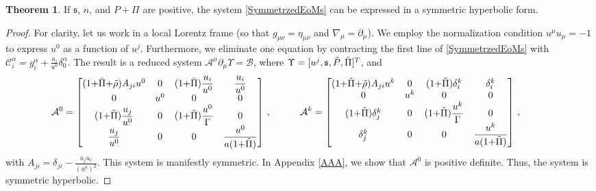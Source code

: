 \documentclass[a4paper, amsfonts, amssymb, amsmath, reprint, showkeys, nofootinbib, twoside,notitlepage,onecolumn]{revtex4-2}
\newcommand{\spc}{\quad \quad \quad}
\newcommand{\s}{{\mathfrak{s}}}
\theoremstyle{definition}
\theoremstyle{theorem}
\newtheorem{theorem}{Theorem}
\theoremstyle{corollary}
\begin{document}


\begin{theorem}
If $\s$, $n$, and $P{+}\Pi$ are positive, the system \eqref{SymmetrzedEoMs} can be expressed in a symmetric hyperbolic form.
\end{theorem}
\begin{proof}
For clarity, let us work in a local Lorentz frame (so that $g_{\mu \nu}=\eta_{\mu \nu}$ and $\nabla_\mu=\partial_\mu$). We employ the normalization condition $u^\mu u_\mu=-1$ to express $u^0$ as a function of $u^j$. Furthermore, we eliminate one equation by contracting the first line of \eqref{SymmetrzedEoMs} with $\mathcal{C}^\alpha_i=g^\alpha_i+\frac{u_i}{u^0}\delta^\alpha_0$. The result is a reduced system $\mathcal{A}^\mu \partial_\mu \Upsilon=\mathcal{B}$, where $\Upsilon=[u^j,\s,\Tilde{P},\Tilde{\Pi}]^T$, and
\begin{equation}
\mathcal{A}^0=
\begin{bmatrix}
(1 {+}\Tilde{\Pi}{+}\Tilde{\rho})A_{ji}u^0 & 0 & (1{+}\Tilde{\Pi})\dfrac{u_i}{u^0} & \dfrac{u_i}{u^0} \\
0 & u^0 & 0 & 0 \\
(1{+}\Tilde{\Pi})\dfrac{u_j}{u^0} & 0 & (1{+}\Tilde{\Pi})\dfrac{u^0}{\Gamma} & 0 \\
\dfrac{u_j}{u^0} & 0 & 0 & \dfrac{u^0}{a(1{+}\Tilde{\Pi})} \\
\end{bmatrix} \, , \spc
\mathcal{A}^k=
\begin{bmatrix}
(1 {+}\Tilde{\Pi}{+}\Tilde{\rho})A_{ji}u^k & 0 & (1{+}\Tilde{\Pi})\delta^k_i & \delta^k_i \\
0 & u^k & 0 & 0 \\
(1{+}\Tilde{\Pi})\delta^k_j & 0 & (1{+}\Tilde{\Pi})\dfrac{u^k}{\Gamma}  & 0 \\
\delta^k_j & 0 & 0 & \dfrac{u^k}{a(1{+}\Tilde{\Pi})} \\
\end{bmatrix} \, , \spc
\end{equation}
with $A_{ji}=\delta_{ji}-\frac{u_j u_i}{(u^0)^2}$. This system is manifestly symmetric. In Appendix \ref{AAA}, we show that $\mathcal{A}^0$ is positive definite. Thus, the system is symmetric hyperbolic.
\end{proof}
\end{document}
